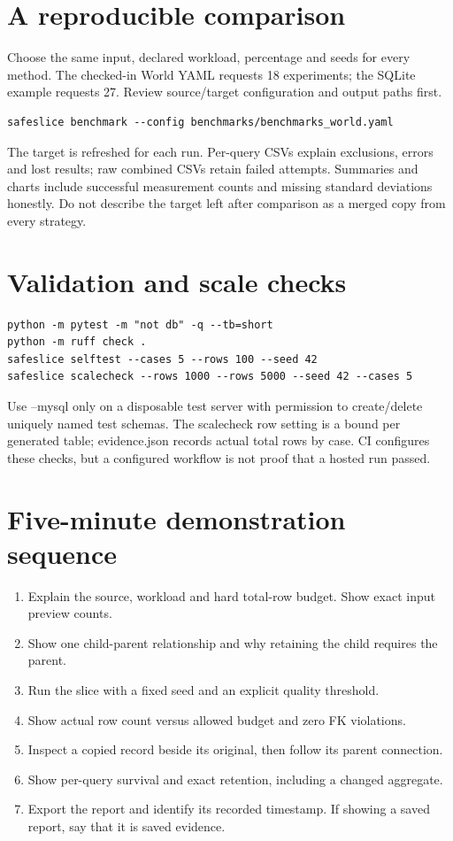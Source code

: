 \documentclass[11pt,a4paper,oneside]{report}
\begin{document}
\section{A reproducible comparison}
Choose the same input, declared workload, percentage and seeds for every method. The checked-in World YAML requests 18 experiments; the SQLite example requests 27. Review source/target configuration and output paths first.
\begin{lstlisting}[language={}]
safeslice benchmark --config benchmarks/benchmarks_world.yaml
\end{lstlisting}
The target is refreshed for each run. Per-query CSVs explain exclusions, errors and lost results; raw combined CSVs retain failed attempts. Summaries and charts include successful measurement counts and missing standard deviations honestly. Do not describe the target left after comparison as a merged copy from every strategy.

\section{Validation and scale checks}
\begin{lstlisting}[language={}]
python -m pytest -m "not db" -q --tb=short
python -m ruff check .
safeslice selftest --cases 5 --rows 100 --seed 42
safeslice scalecheck --rows 1000 --rows 5000 --seed 42 --cases 5
\end{lstlisting}
Use --mysql only on a disposable test server with permission to create/delete uniquely named test schemas. The scalecheck row setting is a bound per generated table; evidence.json records actual total rows by case. CI configures these checks, but a configured workflow is not proof that a hosted run passed.

\section{Five-minute demonstration sequence}
\begin{enumerate}
\item Explain the source, workload and hard total-row budget. Show exact input preview counts.
\item Show one child-parent relationship and why retaining the child requires the parent.
\item Run the slice with a fixed seed and an explicit quality threshold.
\item Show actual row count versus allowed budget and zero FK violations.
\item Inspect a copied record beside its original, then follow its parent connection.
\item Show per-query survival and exact retention, including a changed aggregate.
\item Export the report and identify its recorded timestamp. If showing a saved report, say that it is saved evidence.
\end{enumerate}
\end{document}
